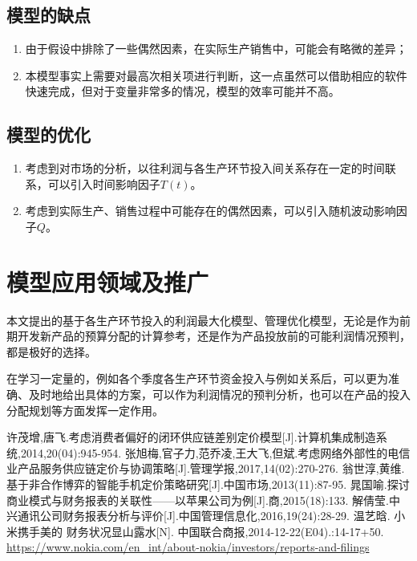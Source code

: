 \documentclass[12pt]{article}%
\begin{document}
\subsection{模型的缺点}
\begin{enumerate}[1.]\addtolength{\itemsep}{-1.5ex}
\item 由于假设中排除了一些偶然因素，在实际生产销售中，可能会有略微的差异；
\item 本模型事实上需要对最高次相关项进行判断，这一点虽然可以借助相应的软件快速完成，但对于变量非常多的情况，模型的效率可能并不高。
\end{enumerate}
\subsection{模型的优化}
\begin{enumerate}[1.]\addtolength{\itemsep}{-1.5ex}
\item 考虑到对市场的分析，以往利润与各生产环节投入间关系存在一定的时间联系，可以引入时间影响因子$T(t)$。
\item 考虑到实际生产、销售过程中可能存在的偶然因素，可以引入随机波动影响因子$Q$。
\end{enumerate}
\section{模型应用领域及推广}
本文提出的基于各生产环节投入的利润最大化模型、管理优化模型，无论是作为前期开发新产品的预算分配的计算参考，还是作为产品投放前的可能利润情况预判，都是极好的选择。

在学习一定量的，例如各个季度各生产环节资金投入与例如关系后，可以更为准确、及时地给出具体的方案，可以作为利润情况的预判分析，也可以在产品的投入分配规划等方面发挥一定作用。
\begin{thebibliography}{15}\addtolength{\itemsep}{-2.5ex}
许茂增,唐飞.考虑消费者偏好的闭环供应链差别定价模型[J].计算机集成制造系统,2014,20(04):945-954.
张旭梅,官子力,范乔凌,王大飞,但斌.考虑网络外部性的电信业产品服务供应链定价与协调策略[J].管理学报,2017,14(02):270-276.
翁世淳,黄维.基于非合作博弈的智能手机定价策略研究[J].中国市场,2013(11):87-95.
晁国喻.探讨商业模式与财务报表的关联性——以苹果公司为例[J].商,2015(18):133.
 解倩莹.中兴通讯公司财务报表分析与评价[J].中国管理信息化,2016,19(24):28-29.
 温艺晗. 小米携手美的 财务状况显山露水[N]. 中国联合商报,2014-12-22(E04).:14-17+50.
 \url{https://www.nokia.com/en_int/about-nokia/investors/reports-and-filings}
\end{thebibliography}
\renewcommand\appendix{\setcounter{secnumdepth}{-2}}
\appendix
{}
\end{document}

